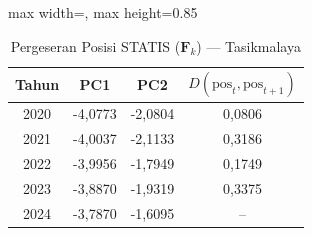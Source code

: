 \begin{table}[H]
\centering
\caption{Pergeseran Posisi STATIS ($\mathbf{F}_k$) --- Tasikmalaya} \label{tab:app1jarak_statis_skor_tasikmalaya}
\begin{adjustbox}{max width=\textwidth, max height=0.85\textheight}
\begin{tabular}{|c|c|c|c|}
\hline
\textbf{Tahun} & \textbf{PC1} & \textbf{PC2} & \textbf{$D(\text{pos}_t, \text{pos}_{t+1})$} \\
\hline
2020 & -4,0773 & -2,0804 & 0,0806 \\
2021 & -4,0037 & -2,1133 & 0,3186 \\
2022 & -3,9956 & -1,7949 & 0,1749 \\
2023 & -3,8870 & -1,9319 & 0,3375 \\
2024 & -3,7870 & -1,6095 & -- \\
\hline
\end{tabular}
\end{adjustbox}
\end{table}